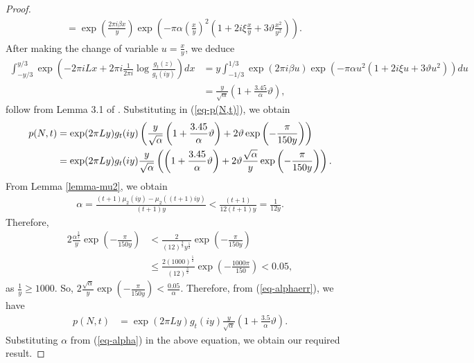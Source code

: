 \documentclass[11pt]{amsart}
\theoremstyle{plain}
\numberwithin{equation}{section}
\begin{document}
\begin{proof}
\begin{align}
				&=\exp\left(\frac{2\pi i\beta x}{y}\right)\exp\left(-\pi\alpha\left(\frac{x}{y}\right)^{2}\left(1+2i\xi\frac{x}{y}+3\vartheta \frac{x^{2}}{y^{2}}\right)\right).
			\end{align}
			After making the change of variable $u=\frac{x}{y}$, we deduce
			\begin{align*}
				\int_{-y/3}^{y/3}\exp\left(-2\pi i Lx+2\pi i\frac{1}{2\pi i}\log\frac{g_{t}(z)}{g_{t}(iy)}\right)dx&=y\int_{-1/3}^{1/3}\exp\left(2\pi i\beta u\right)\exp\left(-\pi\alpha u^{2}\left(1+2i\xi u+3\vartheta u^{2}\right)\right)du\\
				&=\frac{y}{\sqrt{\alpha}}\left(1+\frac{3.45}{\alpha}\vartheta\right),
			\end{align*}
			follow from Lemma 3.1 of \cite{tyler2024asymptotics}.
			Substituting in (\ref{eq-p(N,t)}), we obtain 
			\begin{align}\label{eq-alphaerr}
				\notag
				p(N,t)&=\exp(2\pi Ly)g_{t}(iy)\left(\frac{y}{\sqrt{\alpha}}\left(1+\frac{3.45}{\alpha}\vartheta\right)+2\vartheta\exp\left(-\frac{\pi}{150y}\right)\right)\\
				&=\exp(2\pi Ly)g_{t}(iy)\frac{y}{\sqrt{\alpha}}\left(\left(1+\frac{3.45}{\alpha}\vartheta\right)+2\vartheta\frac{\sqrt{\alpha}}{y} \exp\left(-\frac{\pi}{150y}\right)\right).
			\end{align}
			From Lemma \ref{lemma-mu2}, we obtain 
			\begin{align*}
				\alpha =\frac{(t+1)\mu_{2}(iy)-\mu_{2}((t+1)iy)}{(t+1)y}< \frac{(t+1)}{12(t+1)y}=\frac{1}{12y}.
			\end{align*}
			Therefore,
			\begin{align*}
				2\frac{{\alpha^{\frac{3}{2}}}}{y} \exp\left(-\frac{\pi}{150y}\right)&<\frac{2}{(12)^{\frac{3}{2}}y^{\frac{5}{2}}} \exp\left(-\frac{\pi}{150y}\right)\\
				&\le \frac{2(1000)^{\frac{5}{2}}}{(12)^{\frac{3}{2}}} \exp\left(-\frac{1000\pi}{150}\right)<0.05,
			\end{align*}
			as $ \frac{1}{y}\ge 1000$. So, $ 2\frac{\sqrt{\alpha}}{y} \exp\left(-\frac{\pi}{150y}\right)<\frac{0.05}{\alpha}.$ Therefore, from (\ref{eq-alphaerr}), we have
			\begin{align*}
				p(N,t) &=\exp(2\pi Ly)g_{t}(iy)\frac{y}{\sqrt{\alpha}}\left(1+\frac{3.5}{\alpha}\vartheta\right).   
			\end{align*}
			Substituting $\alpha$ from (\ref{eq-alpha}) in the above equation, we obtain our required result.
		\end{proof} 
		
\end{document}
